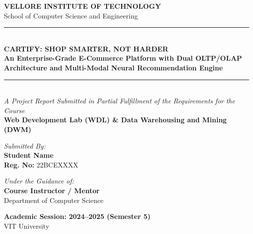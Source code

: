 \documentclass[12pt,a4paper,oneside]{report}
\begin{document}
\begin{titlepage}
    \centering
    \vspace*{0.5cm}
    
    {\Large \textbf{VELLORE INSTITUTE OF TECHNOLOGY}}\\[0.2cm]
    {\large School of Computer Science and Engineering}\\[0.5cm]
    
    \rule{\linewidth}{1pt}\\[0.4cm]
    {\huge \textbf{CARTIFY: SHOP SMARTER, NOT HARDER}}\\[0.3cm]
    {\large \textbf{An Enterprise-Grade E-Commerce Platform with Dual OLTP/OLAP Architecture and Multi-Modal Neural Recommendation Engine}}\\[0.4cm]
    \rule{\linewidth}{1pt}\\[1.5cm]
    
    \textit{A Project Report Submitted in Partial Fulfillment of the Requirements for the Course}\\[0.3cm]
    \textbf{Web Development Lab (WDL) \& Data Warehousing and Mining (DWM)}\\[1.5cm]
    
    \begin{minipage}{0.45\textwidth}
        \begin{flushleft} \large
            \emph{Submitted By:}\\
            \textbf{Student Name}\\
            \textbf{Reg. No:} 22BCEXXXX
        \end{flushleft}
    \end{minipage}
    \begin{minipage}{0.45\textwidth}
        \begin{flushright} \large
            \emph{Under the Guidance of:}\\
            \textbf{Course Instructor / Mentor}\\
            Department of Computer Science
        \end{flushright}
    \end{minipage}
    
    \vfill
    
    {\large \textbf{Academic Session: 2024--2025 (Semester 5)}}\\[0.2cm]
    {\large VIT University}
\end{titlepage}
\end{document}
